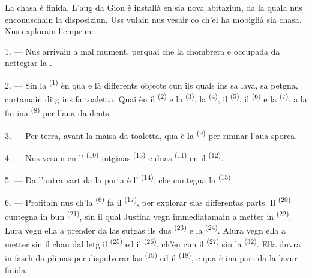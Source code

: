 La chasa è finida. L'aug da Gion è installà en sia nova abitaziun, da la quala nus
enconuschain la disposiziun. Uss vulain nus vesair co ch'el ha mobiglià sia chasa.
Nus explorain l'emprim:

\VUsaut{3.0mm}

1. --- Nus arrivain a mal mument, perquai che la chombrera è occupada da nettegiar
la .

2. --- Sin la  \textsuperscript{(1)} èn qua e là differents
objects cun ils quals ins sa lava, sa petgna, curtamain ditg ins fa toaletta. Quai
èn il  \textsuperscript{(2)} e la 
\textsuperscript{(3)}, la  \textsuperscript{(4)}, il
 \textsuperscript{(5)}, il  \textsuperscript{(6)} e la
 \textsuperscript{(7)}, a la fin ina 
\textsuperscript{(8)} per l'aua da dents.

3. --- Per terra, avant la maisa da toaletta, qua è la 
\textsuperscript{(9)} per rimnar l'aua sporca.

4. --- Nus vesain en l' \textsuperscript{(10)} intginas
 \textsuperscript{(13)} e duas 
\textsuperscript{(11)} en il  \textsuperscript{(12)}.

5. --- Da l'autra vart da la porta è l'
\textsuperscript{(14)}, che cuntegna la  \textsuperscript{(15)}.

6. --- Profitain nus ch'la  \textsuperscript{(6)} fa il 
\textsuperscript{(17)}, per explorar sias differentas parts. Il 
\textsuperscript{(20)} cuntegna in bun 
\textsuperscript{(21)}, sin il qual Justina vegn immediatamain a metter in
 \textsuperscript{(22)}. Lura vegn ella a prender da las
sutgas ils dus  \textsuperscript{(23)} e la 
\textsuperscript{(24)}. Alura vegn ella a metter sin il chau dal letg il
 \textsuperscript{(25)} ed il 
\textsuperscript{(26)}, ch'èn cun il  \textsuperscript{(27)} sin la
 \textsuperscript{(32)}. Ella duvra in fasch da plimas per
dispulverar las  \textsuperscript{(19)} ed il 
\textsuperscript{(18)}, e qua è ina part da la lavur finida.

